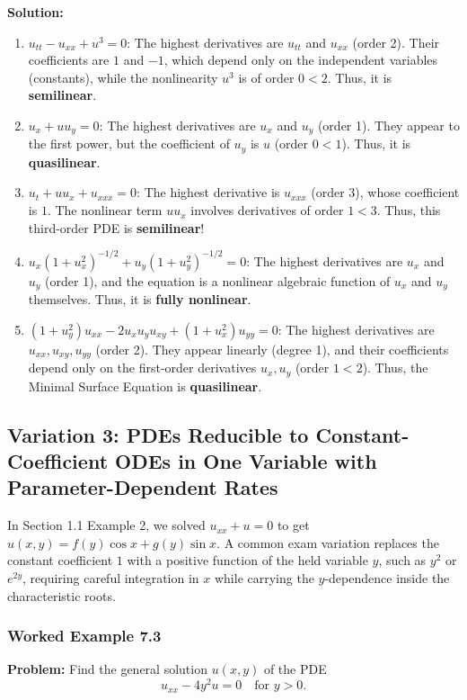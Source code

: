 \documentclass[11pt,a4paper]{article}
\begin{document}
\textbf{Solution:}
\begin{enumerate}[label=(\alph*)]
    \item $u_{tt} - u_{xx} + u^3 = 0$: The highest derivatives are $u_{tt}$ and $u_{xx}$ (order 2). Their coefficients are $1$ and $-1$, which depend only on the independent variables (constants), while the nonlinearity $u^3$ is of order $0 < 2$. Thus, it is \textbf{semilinear}.
    \item $u_x + u u_y = 0$: The highest derivatives are $u_x$ and $u_y$ (order 1). They appear to the first power, but the coefficient of $u_y$ is $u$ (order $0 < 1$). Thus, it is \textbf{quasilinear}.
    \item $u_t + u u_x + u_{xxx} = 0$: The highest derivative is $u_{xxx}$ (order 3), whose coefficient is $1$. The nonlinear term $u u_x$ involves derivatives of order $1 < 3$. Thus, this third-order PDE is \textbf{semilinear}!
    \item $u_x(1 + u_x^2)^{-1/2} + u_y(1 + u_y^2)^{-1/2} = 0$: The highest derivatives are $u_x$ and $u_y$ (order 1), and the equation is a nonlinear algebraic function of $u_x$ and $u_y$ themselves. Thus, it is \textbf{fully nonlinear}.
    \item $(1 + u_y^2)u_{xx} - 2u_x u_y u_{xy} + (1 + u_x^2)u_{yy} = 0$: The highest derivatives are $u_{xx}, u_{xy}, u_{yy}$ (order 2). They appear linearly (degree 1), and their coefficients depend only on the first-order derivatives $u_x, u_y$ (order $1 < 2$). Thus, the Minimal Surface Equation is \textbf{quasilinear}.
\end{enumerate}

\subsection{Variation 3: PDEs Reducible to Constant-Coefficient ODEs in One Variable with Parameter-Dependent Rates}
In Section 1.1 Example 2, we solved $u_{xx} + u = 0$ to get $u(x, y) = f(y)\cos x + g(y)\sin x$. A common exam variation replaces the constant coefficient $1$ with a positive function of the held variable $y$, such as $y^2$ or $e^{2y}$, requiring careful integration in $x$ while carrying the $y$-dependence inside the characteristic roots.

\subsubsection*{Worked Example 7.3}
\textbf{Problem:} Find the general solution $u(x, y)$ of the PDE
\[
    u_{xx} - 4y^2 u = 0 \quad \text{for } y > 0.
\]
\end{document}
